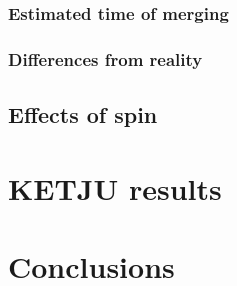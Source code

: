 \documentclass[english, oneside]{HYgradu}
\begin{document}
\subsection{Estimated time of merging}
\subsection{Differences from reality}
\section{Effects of spin}

\chapter{KETJU results}
\section{}

\chapter{Conclusions}


\clearpage
{} %

\small

\end{document}

